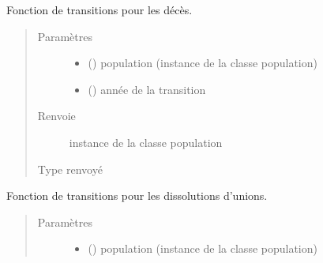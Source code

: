 \documentclass[letterpaper,10pt,french]{sphinxmanual}
\begin{document}
\begin{fulllineitems}
\begin{fulllineitems}
\label{\detokenize{code:simgen.update.dead}}
Fonction de transitions pour les décès.
\begin{quote}\begin{description}
\item[{Paramètres}] \leavevmode\begin{itemize}
\item {} 
 ({\hyperref[\detokenize{code:simgen.population}]{}}) \textendash{} population (instance de la classe population)

\item {} 
 () \textendash{} année de la transition

\end{itemize}

\item[{Renvoie}] \leavevmode
instance de la classe population

\item[{Type renvoyé}] \leavevmode
{\hyperref[\detokenize{code:simgen.population}]{}}

\end{description}\end{quote}

\end{fulllineitems}


\begin{fulllineitems}
\label{\detokenize{code:simgen.update.divorce}}
Fonction de transitions pour les dissolutions d’unions.
\begin{quote}\begin{description}
\item[{Paramètres}] \leavevmode\begin{itemize}
\item {} 
 ({\hyperref[\detokenize{code:simgen.population}]{}}) \textendash{} population (instance de la classe population)


\end{itemize}
\end{description}
\end{quote}
\end{fulllineitems}
\end{fulllineitems}
\end{document}

